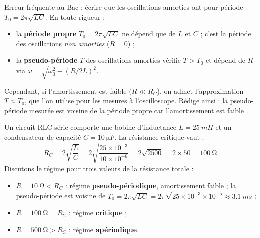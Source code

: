 \documentclass[11pt]{article}
\begin{document}
\begin{attention}
Erreur fréquente au Bac : écrire que les oscillations amorties ont pour période $T_0 = 2\pi\sqrt{LC}$. En toute rigueur :
\begin{itemize}
\item la \textbf{période propre} $T_0 = 2\pi\sqrt{LC}$ ne dépend que de $L$ et $C$ ; c'est la période des oscillations \emph{non amorties} ($R = 0$) ;
\item la \textbf{pseudo-période} $T$ des oscillations amorties vérifie $T > T_0$ et dépend de $R$ via $\omega = \sqrt{\omega_0^2 - (R/2L)^2}$.
\end{itemize}
Cependant, si l'amortissement est faible ($R \ll R_C$), on admet l'approximation $T \approx T_0$, que l'on utilise pour les mesures à l'oscilloscope. Rédige ainsi : \og la pseudo-période mesurée est voisine de la période propre car l'amortissement est faible \fg{}.
\end{attention}

\begin{exemplebox}
Un circuit RLC série comporte une bobine d'inductance $L = \SI{25}{mH}$ et un condensateur de capacité $C = \SI{10}{\micro F}$. La résistance critique vaut :
\[ R_C = 2\sqrt{\frac{L}{C}} = 2\sqrt{\frac{25\times 10^{-3}}{10\times 10^{-6}}} = 2\sqrt{2500} = 2\times 50 = \SI{100}{\ohm} \]
Discutons le régime pour trois valeurs de la résistance totale :
\begin{itemize}
\item $R = \SI{10}{\ohm} < R_C$ : régime \textbf{pseudo-périodique}, amortissement faible ; la pseudo-période est voisine de $T_0 = 2\pi\sqrt{LC} = 2\pi\sqrt{25\times 10^{-3}\times 10^{-5}} \approx \SI{3,1}{ms}$ ;
\item $R = \SI{100}{\ohm} = R_C$ : régime \textbf{critique} ;
\item $R = \SI{500}{\ohm} > R_C$ : régime \textbf{apériodique}.
\end{itemize}
\end{exemplebox}
\end{document}
